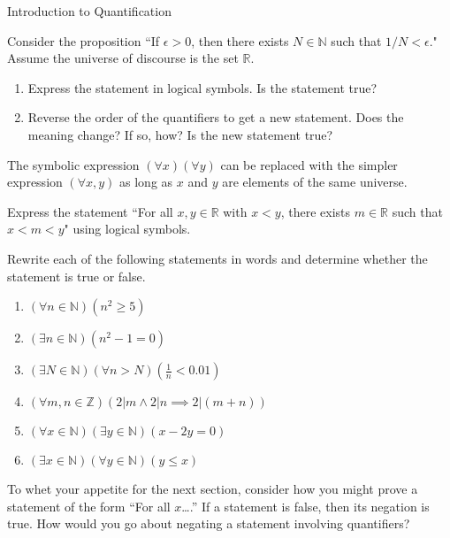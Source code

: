\begin{section}{Introduction to Quantification}
\begin{problem}
Consider the proposition ``If $\epsilon >0$, then there exists $N\in\mathbb{N}$ such that $1/N<\epsilon$."  Assume the universe of discourse is the set $\mathbb{R}$.
\begin{enumerate}[label=\textrm{(\alph*)}]
\item Express the statement in logical symbols. Is the statement true?
\item Reverse the order of the quantifiers to get a new statement. Does the meaning change?  If so, how?  Is the new statement true?
\end{enumerate}
\end{problem}

The symbolic expression $(\forall x)(\forall y)$ can be replaced with the simpler expression $(\forall x,y)$ as long as $x$ and $y$ are elements of the same universe.

\begin{problem}
Express the statement ``For all $x,y\in\mathbb{R}$ with $x<y$, there exists $m\in\mathbb{R}$ such that $x<m<y$" using logical symbols.
\end{problem}

\begin{problem}
Rewrite each of the following statements in words and determine whether the statement is true or false.
\begin{enumerate}[label=\textrm{(\alph*)}]
\item $(\forall n \in \mathbb{N})(n^2 \geq 5)$
\item $(\exists n \in \mathbb{N})(n^2-1=0)$
\item $(\exists N \in \mathbb{N})(\forall  n > N)(\frac{1}{n} < 0.01)$
\item $(\forall m, n \in \mathbb{Z})(2|m \wedge 2|n \implies 2|(m+n))$
\item $(\forall x \in \mathbb{N})(\exists y \in \mathbb{N})(x-2y=0)$
\item $(\exists x \in \mathbb{N})(\forall y \in \mathbb{N})(y \leq x)$
\end{enumerate}
\end{problem}

To whet your appetite for the next section, consider how you might prove a statement of the form ``For all $x$\ldots.'' If a statement is false, then its negation is true. How would you go about negating a statement involving quantifiers? 

\end{section}
